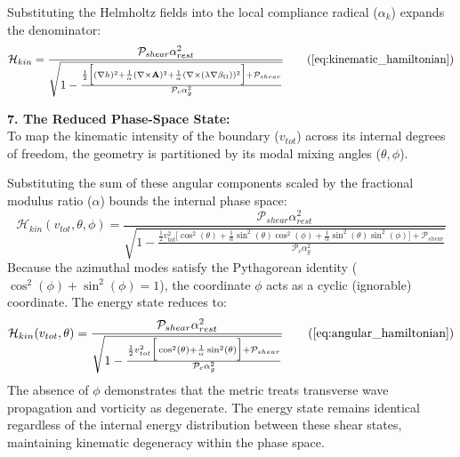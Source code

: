 Substituting the Helmholtz fields into the local compliance radical ($\alpha_k$) expands the denominator:
\begin{equation}
    \mathcal{H}_{kin} = \frac{\mathcal{P}_{shear} \alpha_{rest}^2}{\sqrt{1 - \frac{\frac{1}{2} \Big[ (\nabla h)^2 + \frac{1}{\alpha}(\nabla \times \mathbf{A})^2 + \frac{1}{\alpha}(\nabla \times (\lambda \nabla \beta_\Omega))^2 \Big] + \mathcal{P}_{shear}}{\mathcal{P}_c \alpha_g^2}}} \tag{\ref{eq:kinematic_hamiltonian}}
\end{equation}

\textbf{7. The Reduced Phase-Space State:} \\
To map the kinematic intensity of the boundary ($v_{tot}$) across its internal degrees of freedom, the geometry is partitioned by its modal mixing angles ($\theta, \phi$). 

Substituting the sum of these angular components scaled by the fractional modulus ratio ($\alpha$) bounds the internal phase space:
\begin{equation}
    \mathcal{H}_{kin}(v_{tot}, \theta, \phi) = \frac{\mathcal{P}_{shear} \alpha_{rest}^2}{\sqrt{1 - \frac{\frac{1}{2} v_{tot}^2 \Big[ \cos^2(\theta) + \frac{1}{\alpha}\sin^2(\theta)\cos^2(\phi) + \frac{1}{\alpha}\sin^2(\theta)\sin^2(\phi) \Big] + \mathcal{P}_{shear}}{\mathcal{P}_c \alpha_g^2}}} \nonumber
\end{equation}
Because the azimuthal modes satisfy the Pythagorean identity ($\cos^2(\phi) + \sin^2(\phi) = 1$), the coordinate $\phi$ acts as a cyclic (ignorable) coordinate. The energy state reduces to: 
\begin{equation}
    \mathcal{H}_{kin}(v_{tot}, \theta) = \frac{\mathcal{P}_{shear} \alpha_{rest}^2}{\sqrt{1 - \frac{\frac{1}{2} v_{tot}^2 \Big[ \cos^2(\theta) + \frac{1}{\alpha}\sin^2(\theta) \Big] + \mathcal{P}_{shear}}{\mathcal{P}_c \alpha_g^2}}} \tag{\ref{eq:angular_hamiltonian}}
\end{equation}
The absence of $\phi$ demonstrates that the metric treats transverse wave propagation and vorticity as degenerate. The energy state remains identical regardless of the internal energy distribution between these shear states, maintaining kinematic degeneracy within the phase space. 

